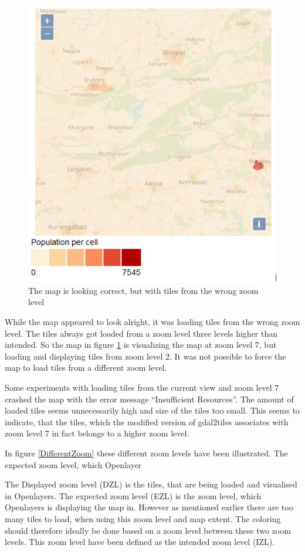 \begin{figure} [H]
	\centering
	\includegraphics[width=.8\textwidth]{Pictures/MapWithWrongResolution}
	\caption{The map is looking correct, but with tiles from the wrong zoom level}
	\label{MapWithWrongResolution}
\end{figure}


While the map appeared to look alright, it was loading tiles from the wrong zoom level. The tiles always got loaded from a zoom level three levels higher than intended. So the map in figure \ref{MapWithWrongResolution} is visualizing the map at zoom level 7, but loading and displaying tiles from zoom level 2. It was not possible to force the map to load tiles from a different zoom level.

Some experiments with loading tiles from the current view and zoom level 7 crashed the map with the error message “Insufficient Resources”. The amount of loaded tiles seems unnecessarily high and size of the tiles too small. This seems to indicate, that the tiles, which the modified version of gdal2tiles associates with zoom level 7 in fact belongs to a higher zoom level.

In figure \ref{DifferentZoom} these different zoom levels have been illustrated. The expected zoom level, which Openlayer

The Displayed zoom level (DZL) is the tiles, that are being loaded and visualised in Openlayers. The expected zoom level (EZL) is the zoom level, which Openlayers is displaying the map in. However as mentioned earlier there are too many tiles to load, when using this zoom level and map extent. The coloring should therefore ideally be done based on a zoom level between these two zoom levels. This zoom level have been defined as the intended zoom level (IZL).


